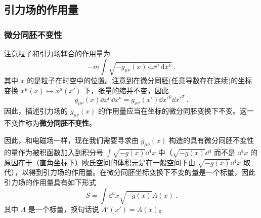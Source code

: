 \subsection{引力场的作用量}

\subsubsection{微分同胚不变性}
注意粒子和引力场耦合的作用量为
\begin{equation}
-m\int\sqrt{-g_{\mu\nu}(x) \,\mathrm{d}{x} ^\mu \,\mathrm{d}{x} ^\nu}~.
\end{equation}
其中 $x$ 的是粒子在时空中的位置。注意到在微分同胚(任意导数存在连续)的坐标变换 $x^\mu(x) \mapsto x^\mu(x')$ 下，张量的缩并不变，因此
\begin{equation}
g_{\mu\nu}(x) \dd x^\mu \dd{x} ^\nu=g_{\rho\sigma}(x') \dd{x'} ^\rho \dd{x'} ^{\sigma}~.
\end{equation}
因此，描述引力场的 $g_{\mu\nu}(x)$ 的作用量应当在坐标的微分同胚变换下不变。这一不变性称为\textbf{微分同胚不变性}。

因此，和电磁场一样，现在我们需要寻求由 $g_{\mu\nu}(x)$ 构造的具有微分同胚不变性的量作为被积函数加入到积分号 $\int\sqrt{-g(x)}\dd{}^4x$ 中（$\sqrt{-g(x)}\dd{}^4$ 而不是 $\dd{}^4x$ 的原因在于（直角坐标下）欧氏空间的体积元是在一般空间下由 $\sqrt{-g(x)}\dd{}^4 x$ 取代），以得到引力场的作用量。在微分同胚坐标变换下不变的量是一个标量，因此引力场的作用量具有如下形式
\begin{equation}
S=\int\dd{}^4x\sqrt{-g(x)}A(x)~.
\end{equation}
其中 $A$ 是一个标量，换句话说 $A'(x')=A(x)$。



























